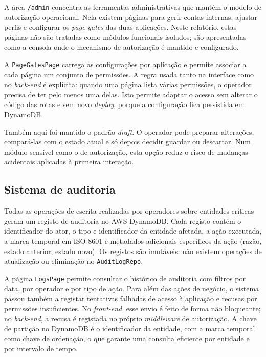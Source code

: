 A área \texttt{/admin} concentra as ferramentas administrativas que mantêm o modelo de autorização operacional. Nela existem páginas para gerir contas internas, ajustar perfis e configurar os \textit{page gates} das duas aplicações. Neste relatório, estas páginas não são tratadas como módulos funcionais isolados; são apresentadas como a consola onde o mecanismo de autorização é mantido e configurado.

A \texttt{PageGatesPage} carrega as configurações por aplicação e permite associar a cada página um conjunto de permissões. A regra usada tanto na interface como no \textit{back-end} é explícita: quando uma página lista várias permissões, o operador precisa de ter pelo menos uma delas. Isto permite adaptar o acesso sem alterar o código das rotas e sem novo \textit{deploy}, porque a configuração fica persistida em DynamoDB.

Também aqui foi mantido o padrão \textit{draft}. O operador pode preparar alterações, compará-las com o estado atual e só depois decidir guardar ou descartar. Num módulo sensível como o de autorização, esta opção reduz o risco de mudanças acidentais aplicadas à primeira interação.

\subsection{Sistema de auditoria}
\label{subsec:impl_audit}

Todas as operações de escrita realizadas por operadores sobre entidades críticas geram um registo de auditoria no AWS DynamoDB. Cada registo contém o identificador do ator, o tipo e identificador da entidade afetada, a ação executada, a marca temporal em ISO 8601 e metadados adicionais específicos da ação (razão, estado anterior, estado novo). Os registos são imutáveis: não existem operações de atualização ou eliminação no \texttt{AuditLogRepo}.

A página \texttt{LogsPage} permite consultar o histórico de auditoria com filtros por data, por operador e por tipo de ação. Para além das ações de negócio, o sistema passou também a registar tentativas falhadas de acesso à aplicação e recusas por permissões insuficientes. No \textit{front-end}, esse envio é feito de forma não bloqueante; no \textit{back-end}, a recusa é registada no próprio \textit{middleware} de autorização. A chave de partição no DynamoDB é o identificador da entidade, com a marca temporal como chave de ordenação, o que garante uma consulta eficiente por entidade e por intervalo de tempo.


